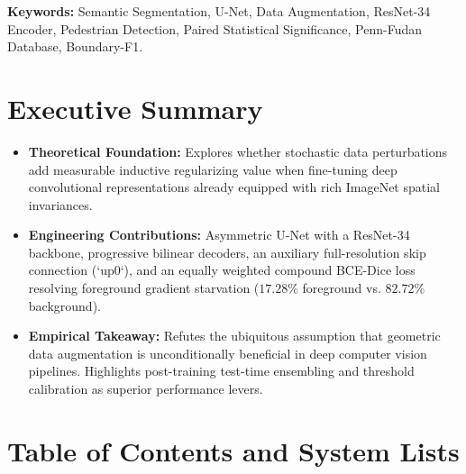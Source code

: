\documentclass[10pt,a4paper]{article}
\begin{document}
\vspace{0.3cm}
\noindent \textbf{Keywords:} Semantic Segmentation, U-Net, Data Augmentation, ResNet-34 Encoder, Pedestrian Detection, Paired Statistical Significance, Penn-Fudan Database, Boundary-F1.

\vspace{0.4cm}
\section*{Executive Summary}
\begin{itemize}
    \item \textbf{Theoretical Foundation:} Explores whether stochastic data perturbations add measurable inductive regularizing value when fine-tuning deep convolutional representations already equipped with rich ImageNet spatial invariances.
    \item \textbf{Engineering Contributions:} Asymmetric U-Net with a ResNet-34 backbone, progressive bilinear decoders, an auxiliary full-resolution skip connection (`up0`), and an equally weighted compound BCE-Dice loss resolving foreground gradient starvation ($17.28\%$ foreground vs. $82.72\%$ background).
    \item \textbf{Empirical Takeaway:} Refutes the ubiquitous assumption that geometric data augmentation is unconditionally beneficial in deep computer vision pipelines. Highlights post-training test-time ensembling and threshold calibration as superior performance levers.
\end{itemize}

\clearpage

\section*{Table of Contents and System Lists}
\makeatletter
{}
\vspace{0.4cm}
\par\nopagebreak\vspace{0.05cm}
\vspace{0.4cm}
\par\nopagebreak\vspace{0.05cm}
\makeatother
\end{document}
